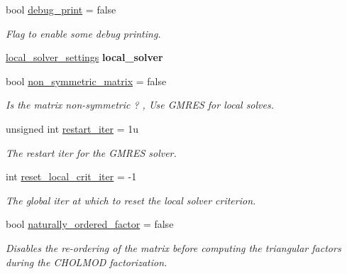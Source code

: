 \begin{DoxyCompactItemize}
\mbox{\label{structschwz_1_1Settings_a5573fab398e7bba73e793eea06aa1e11}} 
bool \hyperlink{structschwz_1_1Settings_a5573fab398e7bba73e793eea06aa1e11}{debug\+\_\+print} = false
\begin{DoxyCompactList}\small\item\em Flag to enable some debug printing. \end{DoxyCompactList}\item 
\hyperlink{structschwz_1_1Settings_a31e82310ef6aed08168baef78f0db69e}{local\+\_\+solver\+\_\+settings} {\bfseries local\+\_\+solver}
\item 
\mbox{\label{structschwz_1_1Settings_a5f110676f929eebeb357cb07398e2048}} 
bool \hyperlink{structschwz_1_1Settings_a5f110676f929eebeb357cb07398e2048}{non\+\_\+symmetric\+\_\+matrix} = false
\begin{DoxyCompactList}\small\item\em Is the matrix non-\/symmetric ? , Use G\+M\+R\+ES for local solves. \end{DoxyCompactList}\item 
\mbox{\label{structschwz_1_1Settings_a7d26302ccb58fd96c795046ecc577694}} 
unsigned int \hyperlink{structschwz_1_1Settings_a7d26302ccb58fd96c795046ecc577694}{restart\+\_\+iter} = 1u
\begin{DoxyCompactList}\small\item\em The restart iter for the G\+M\+R\+ES solver. \end{DoxyCompactList}\item 
\mbox{\label{structschwz_1_1Settings_af257396850c46e4d3217b4bb1a858114}} 
int \hyperlink{structschwz_1_1Settings_af257396850c46e4d3217b4bb1a858114}{reset\+\_\+local\+\_\+crit\+\_\+iter} = -\/1
\begin{DoxyCompactList}\small\item\em The global iter at which to reset the local solver criterion. \end{DoxyCompactList}\item 
bool \hyperlink{structschwz_1_1Settings_a75a2ff3778c7334382a6c74553dbd5b4}{naturally\+\_\+ordered\+\_\+factor} = false
\begin{DoxyCompactList}\small\item\em Disables the re-\/ordering of the matrix before computing the triangular factors during the C\+H\+O\+L\+M\+OD factorization. \end{DoxyCompactList}\item 

\end{DoxyCompactItemize}

